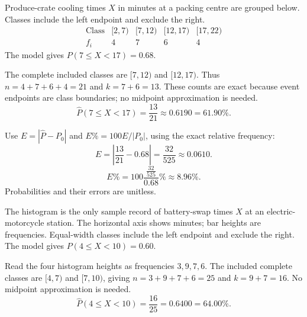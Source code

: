Produce-crate cooling times $X$ in minutes at a packing centre are grouped below. Classes include the left endpoint and exclude the right.
\[\begin{array}{c|rrrr}\text{Class}&[2,7)&[7,12)&[12,17)&[17,22)\\\hline f_i&4&7&6&4\end{array}\]
The model gives $P(7\le X<17)=0.68$.


The complete included classes are $[7,12)$ and $[12,17)$.
Thus $n=4+7+6+4=21$ and $k=7+6=13$. These counts are exact because event endpoints are class boundaries; no midpoint approximation is needed.
\[\widehat P(7\le X<17)=\frac{13}{21}\approx0.6190=61.90\%.\]

Use $E=|\widehat P-P_0|$ and $E\%=100E/|P_0|$, using the exact relative frequency:
\[E=\left|\frac{13}{21}-0.68\right|=\frac{32}{525}\approx0.0610.\]
\[E\%=100\frac{\frac{32}{525}}{0.68}\%\approx8.96\%.\]
Probabilities and their errors are unitless.

The histogram is the only sample record of battery-swap times $X$ at an electric-motorcycle station. The horizontal axis shows minutes; bar heights are frequencies. Equal-width classes include the left endpoint and exclude the right.
The model gives $P(4\le X<10)=0.60$.


Read the four histogram heights as frequencies $3,9,7,6$.
The included complete classes are $[4,7)$ and $[7,10)$, giving $n=3+9+7+6=25$ and $k=9+7=16$. No midpoint approximation is needed.
\[\widehat P(4\le X<10)=\frac{16}{25}=0.6400=64.00\%.\]

